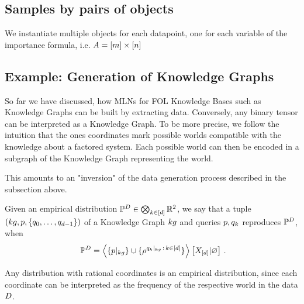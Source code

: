 \subsection{Samples by pairs of objects}

We instantiate multiple objects for each datapoint, one for each variable of the importance formula, i.e. $A=[m]\times[n]$



\subsection{Example: Generation of Knowledge Graphs} %

So far we have discussed, how MLNs for FOL Knowledge Bases such as Knowledge Graphs can be built by extracting data.
Conversely, any binary tensor can be interpreted as a Knowledge Graph.
To be more precise, we follow the intuition that the ones coordinates mark possible worlds compatible with the knowledge about a factored system.
Each possible world can then be encoded in a subgraph of the Knowledge Graph representing the world.

%
This amounts to an "inversion" of the data generation process described in the subsection above.

%


\begin{definition}
	Given an empirical distribution $\mathbb{P}^{D}\in\bigotimes_{k\in[d]}\mathbb{R}^2$, we say that a tuple $(kg,p,\{q_{0},\ldots,q_{d-1}\})$ of a Knowledge Graph $kg$ and queries $p,q_{k}$ reproduces $\mathbb{P}^{D}$, when 
		\[ \empdistribution = \normationof{\{\kggroundingof{\impformula}\}\cup\{\rencodingof{\kggroundingof{\extformulaof{\atomenumerator}}\, : \, \atomenumeratorin}\}}{\shortcatvariables} \, .  \]
\end{definition}

%
Any distribution with rational coordinates is an empirical distribution, since each coordinate can be interpreted as the frequency of the respective world in the data $D$.


